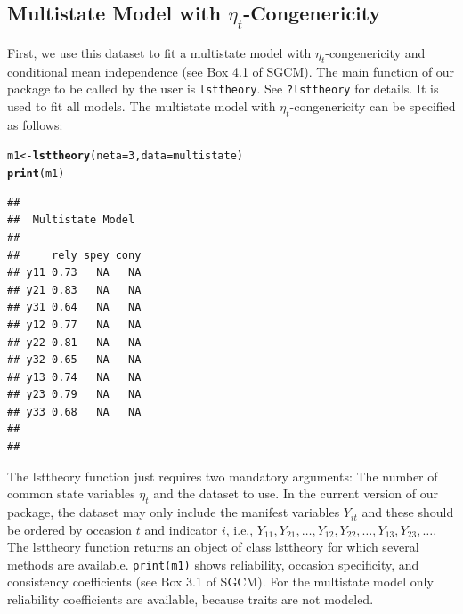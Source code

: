 \documentclass[10pt]{article}\usepackage{graphicx, color}
\makeatletter
\newcommand{\hlfunctioncall}[1]{\textcolor[rgb]{0.501960784313725,0,0.329411764705882}{\textbf{#1}}}%
\newenvironment{kframe}{%
 \def\at@end@of@kframe{}%
 \ifinner\ifhmode%
  \def\at@end@of@kframe{\end{minipage}}%
  \begin{minipage}{\columnwidth}%
 \fi\fi%
 \def\FrameCommand##1{\hskip\@totalleftmargin \hskip-\fboxsep
 \colorbox{shadecolor}{##1}\hskip-\fboxsep
     \hskip-\linewidth \hskip-\@totalleftmargin \hskip\columnwidth}%
 \MakeFramed {\advance\hsize-\width
   \@totalleftmargin\z@ \linewidth\hsize
   \@setminipage}}%
 {\par\unskip\endMakeFramed%
 \at@end@of@kframe}
\newenvironment{knitrout}{}{} %
\makeatother
\begin{document}
%

\subsection{Multistate Model with $\eta_t$-Congenericity}

First, we use this dataset to fit a multistate model with $\eta_t$-congenericity and conditional mean independence (see Box 4.1 of SGCM). The main function of our package to be called by the user is \texttt{lsttheory}. See \texttt{?lsttheory} for details. It is used to fit all models. The multistate model with $\eta_t$-congenericity can be specified as follows:


%
\begin{knitrout}
\color{fgcolor}\begin{kframe}
\begin{alltt}
m1 <- \hlfunctioncall{lsttheory}(neta = 3, data = multistate)
\hlfunctioncall{print}(m1)
\end{alltt}
\begin{verbatim}
## 
##  Multistate Model 
##  
##     rely spey cony
## y11 0.73   NA   NA
## y21 0.83   NA   NA
## y31 0.64   NA   NA
## y12 0.77   NA   NA
## y22 0.81   NA   NA
## y32 0.65   NA   NA
## y13 0.74   NA   NA
## y23 0.79   NA   NA
## y33 0.68   NA   NA
## 
## 
\end{verbatim}
\end{kframe}
\end{knitrout}

%

The lsttheory function just requires two mandatory arguments: The number of common state variables $\eta_t$ and the dataset to use. In the current version of our package, the dataset may only include the manifest variables $Y_{it}$ and these should be ordered by occasion $t$ and indicator $i$, i.e., $Y_{11}, Y_{21}, \ldots, Y_{12}, Y_{22}, \ldots, Y_{13}, Y_{23}, \ldots$. The lsttheory function returns an object of class lsttheory for which several methods are available. \texttt{print(m1)} shows reliability, occasion specificity, and consistency coefficients (see Box 3.1 of SGCM). For the multistate model only reliability coefficients are available, because traits are not modeled.
\end{document}
